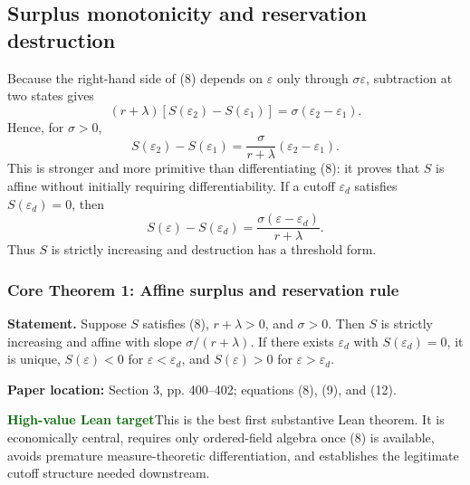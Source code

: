 \documentclass[11pt]{article}
\newcommand{\leanhigh}{\textcolor{darkgreen}{\textbf{High-value Lean target}}}
\newcommand{\papersec}[1]{\textbf{Paper location:} #1}
\newcommand{\statusbox}[2]{\colorbox{#1}{\parbox{0.94\linewidth}{#2}}}
\newcommand{\epsd}{\varepsilon_d}
\begin{document}
\subsection{Surplus monotonicity and reservation destruction}
Because the right-hand side of (8) depends on $\varepsilon$ only through $\sigma\varepsilon$, subtraction at two states gives
\[
(r+\lambda)[S(\varepsilon_2)-S(\varepsilon_1)]
=\sigma(\varepsilon_2-\varepsilon_1).
\]
Hence, for $\sigma>0$,
\begin{equation}
S(\varepsilon_2)-S(\varepsilon_1)
=\frac{\sigma}{r+\lambda}(\varepsilon_2-\varepsilon_1). \tag{12$'$}
\end{equation}
This is stronger and more primitive than differentiating (8): it proves that $S$ is affine without initially requiring differentiability. If a cutoff $\epsd$ satisfies $S(\epsd)=0$, then
\begin{equation}
S(\varepsilon)-S(\epsd)
=\frac{\sigma(\varepsilon-\epsd)}{r+\lambda}. \tag{12}
\end{equation}
Thus $S$ is strictly increasing and destruction has a threshold form.

\subsubsection*{Core Theorem 1: Affine surplus and reservation rule}
\textbf{Statement.} Suppose $S$ satisfies (8), $r+\lambda>0$, and $\sigma>0$. Then $S$ is strictly increasing and affine with slope $\sigma/(r+\lambda)$. If there exists $\epsd$ with $S(\epsd)=0$, it is unique, $S(\varepsilon)<0$ for $\varepsilon<\epsd$, and $S(\varepsilon)>0$ for $\varepsilon>\epsd$.

\papersec{Section 3, pp. 400--402; equations (8), (9), and (12).}

\statusbox{softgreen}{\leanhigh\quad This is the best first substantive Lean theorem. It is economically central, requires only ordered-field algebra once (8) is available, avoids premature measure-theoretic differentiation, and establishes the legitimate cutoff structure needed downstream.}
\end{document}
